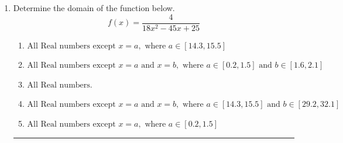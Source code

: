 \documentclass[14pt]{extbook}
\newcommand{\litem}[1]{\item#1\hspace*{-1cm}\rule{\textwidth}{0.4pt}}
\begin{document}
\begin{enumerate}
\litem{
Determine the domain of the function below.\[ f(x) = \frac{4}{18x^{2} -45 x + 25} \]\begin{enumerate}[label=\Alph*.]
\item \( \text{All Real numbers except } x = a, \text{ where } a \in [14.3, 15.5] \)
\item \( \text{All Real numbers except } x = a \text{ and } x = b, \text{ where } a \in [0.2, 1.5] \text{ and } b \in [1.6, 2.1] \)
\item \( \text{All Real numbers.} \)
\item \( \text{All Real numbers except } x = a \text{ and } x = b, \text{ where } a \in [14.3, 15.5] \text{ and } b \in [29.2, 32.1] \)
\item \( \text{All Real numbers except } x = a, \text{ where } a \in [0.2, 1.5] \)


\end{enumerate}}
\end{enumerate}
\end{document}
